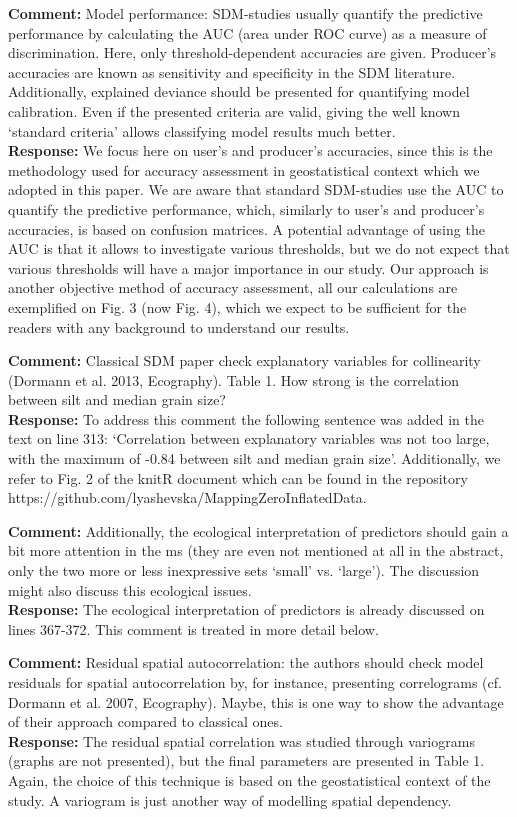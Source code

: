 \documentclass{letter}
\begin{document}
\begin{letter}
\textbf{Comment:} Model performance: SDM-studies usually quantify the predictive performance by calculating the AUC (area under ROC curve) as a measure of discrimination. Here, only threshold-dependent accuracies are given. Producer's accuracies are known as sensitivity and specificity in the SDM literature. Additionally, explained deviance should be presented for quantifying model calibration. Even if the presented criteria are valid, giving the well known `standard criteria' allows classifying model results much better.\\
\textbf{Response:} We focus here on user's and producer's accuracies, since this is the methodology used for accuracy assessment in geostatistical context which we adopted in this paper. We are aware that standard SDM-studies use the AUC to quantify the predictive performance, which, similarly to user's and producer's accuracies, is based on confusion matrices. A potential advantage of using the AUC is that it allows to investigate various thresholds, but we do not expect that various thresholds will have a major importance in our study. Our approach is another objective method of accuracy assessment, all our calculations are exemplified on Fig. 3 (now Fig. 4), which we expect to be sufficient for the readers with any background to understand our results.

\textbf{Comment:} Classical SDM paper check explanatory variables for collinearity (Dormann et al. 2013, Ecography). Table 1. How strong is the correlation between silt and median grain size?\\ 
\textbf{Response:} To address this comment the following sentence was added in the text on line 313: `Correlation between explanatory variables was not too large, with the maximum of -0.84 between silt and median grain size'.
Additionally, we refer to Fig. 2 of the knitR document which can be found in the repository https://github.com/lyashevska/MappingZeroInflatedData.

\textbf{Comment:} Additionally, the ecological interpretation of predictors should gain a bit more attention in the ms (they are even not mentioned at all in the abstract, only the two more or less inexpressive sets `small' vs. `large'). The discussion might also discuss this ecological issues.\\
\textbf{Response:} The ecological interpretation of predictors is already discussed on lines 367-372.
This comment is treated in more detail below. 

\textbf{Comment:} Residual spatial autocorrelation: the authors should check model residuals for spatial autocorrelation by, for instance, presenting correlograms (cf. Dormann et al. 2007, Ecography). Maybe, this is one way to show the advantage of their approach compared to classical ones.\\
\textbf{Response:} The residual spatial correlation was studied through variograms (graphs are not presented), but the final parameters are presented in Table 1.  Again, the choice of this technique is based on the geostatistical context of the study. A variogram is just another way of modelling spatial dependency.


\end{letter}
\end{document}
